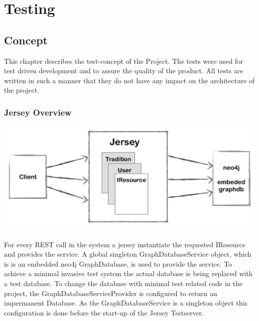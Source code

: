 \documentclass[11pt,fleqn,openany]{book} %
\begin{document}
\part{Testing}



\chapter{Concept}
This chapter describes the test-concept of the Project. The tests were used for test driven development and to assure the quality of the product. All tests are written in such a manner that they do not have any impact on the architecture of the project.

\newpage

\section*{Jersey Overview} 

\begin{center}
\includegraphics[scale=.40]{Pictures/jerseyoverview.png} 
\end{center}

For every REST call in the system a jersey instantiate the requested IResource and provides the service. A global singleton GraphDatabaseService object, which is is an embedded neo4j GraphDatabase, is used to provide the service. To achieve a minimal invasive test system the actual database is being replaced with a test database. To change the database with minimal test related code in the project, the GraphDatabaseServiceProvider is configured to return an impermanent Database. As the GraphDatabaseService is a singleton object this configuration is done before the start-up of the Jersey Testserver.
\end{document}
